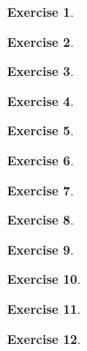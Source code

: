 \documentclass[titlepage,reqno]{amsart}
\theoremstyle{definition}
\newtheorem{exercise}{Exercise}[section]
\theoremstyle{remark}
\begin{document}
\begin{exercise}
    
\end{exercise}

\begin{exercise}
    
\end{exercise}

\begin{exercise}
    
\end{exercise}

\begin{exercise}
    
\end{exercise}

\begin{exercise}
    
\end{exercise}

\begin{exercise}
    
\end{exercise}

\begin{exercise}
    
\end{exercise}

\begin{exercise}
    
\end{exercise}

\begin{exercise}
    
\end{exercise}

\begin{exercise}
    
\end{exercise}

\begin{exercise}
    
\end{exercise}

\begin{exercise}
    
\end{exercise}
\end{document}
